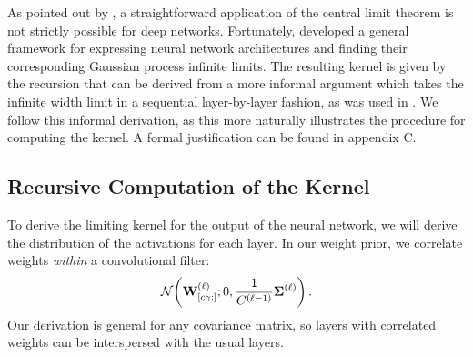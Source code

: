 \documentclass[tablecaption=bottom,wcp,nonatbib]{jmlr} %
\begin{document}
As pointed out by \citet{matthews2018dnnlimit}, a straightforward application of the central limit theorem is not strictly possible for deep networks. Fortunately, \citet{yang2019wide} developed a general framework for expressing neural network architectures and finding their corresponding Gaussian process infinite limits. The resulting kernel is given by the recursion that can be derived from a more informal argument which takes the infinite width limit in a sequential layer-by-layer fashion, as was used in \citet{garriga2018infiniteconv}. We follow this informal derivation, as this more naturally illustrates the procedure for computing the kernel. A formal justification can be found in appendix C.

\subsection{Recursive Computation of the Kernel}
To derive the limiting kernel for the output of the neural network, we will derive the distribution of the activations for each layer. In our weight prior, we correlate weights \emph{within} a convolutional filter:
\begin{align}
    \NormDist{\layerW{\ell}_{[c\gamma :]}; 0, \frac{1}{\layerC{\ell-1}} \priorWcov{\ell}} \,.
\end{align}
Our derivation is general for any covariance matrix, so layers with correlated weights can be interspersed with the usual layers.
\end{document}
